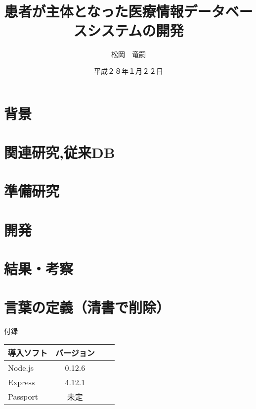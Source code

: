 \documentclass[12pt]{sotsuron}
\title{患者が主体となった医療情報データベースシステムの開発}
\author{松岡　竜嗣}
\date{平成２８年１月２２日}
\affiliation{電子機械工学専攻}
\begin{document}
\maketitle

\begin{abstract}


\end{abstract}

\tableofcontents
\clearpage


\section{背景}

\clearpage

\section{関連研究,従来DB}

\clearpage

\section{準備研究}

\clearpage

\section{開発}

\clearpage



\section{結果・考察}

\clearpage


\section{言葉の定義（清書で削除）}



\appendix

付録

\begin{table}[htb]
	\begin{tabular}{|l|c|r|r|}\hline
	導入ソフト & バージョン \\ \hline \hline
	Node.js & 0.12.6 \\ \hline
	Express & 4.12.1 \\ \hline
	Passport & 未定 \\ \hline
	\end{tabular}
\end{table}
\end{document}
